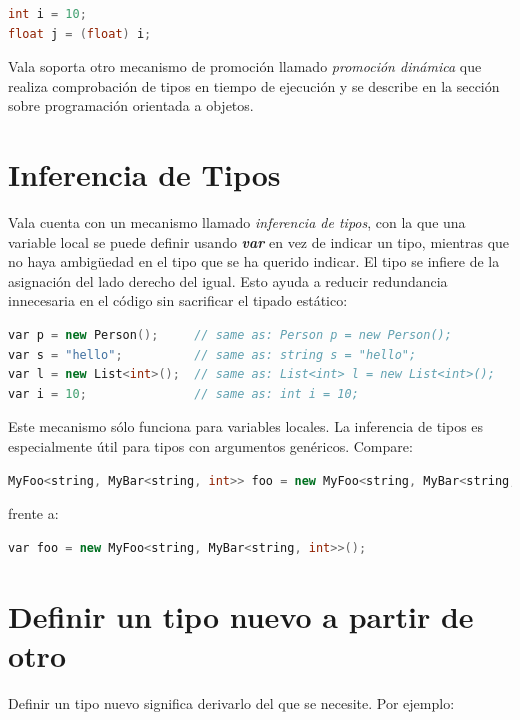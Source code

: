 \documentclass[12pt,twoside]{book}
\begin{document}
\begin{lstlisting}[language=C++]
int i = 10;
float j = (float) i;
\end{lstlisting}

Vala soporta otro mecanismo de promoción llamado \textit{promoción dinámica} que realiza comprobación de tipos en tiempo de ejecución y se describe en la sección sobre programación orientada a objetos.

\section{Inferencia de Tipos}

Vala cuenta con un mecanismo llamado \textit{inferencia de tipos}, con la que una variable local se puede definir usando \textbf{\textit{var}} en vez de indicar un tipo, mientras que no haya ambigüedad en el tipo que se ha querido indicar. El tipo se infiere de la asignación del lado derecho del igual. Esto ayuda a reducir redundancia innecesaria en el código sin sacrificar el tipado estático:

\begin{lstlisting}[language=C++]
var p = new Person();     // same as: Person p = new Person();
var s = "hello";          // same as: string s = "hello";
var l = new List<int>();  // same as: List<int> l = new List<int>();
var i = 10;               // same as: int i = 10;
\end{lstlisting}

Este mecanismo sólo funciona para variables locales. La inferencia de tipos es especialmente útil para tipos con argumentos genéricos. Compare:

\begin{lstlisting}[language=C++]
MyFoo<string, MyBar<string, int>> foo = new MyFoo<string, MyBar<string, int>>();
\end{lstlisting}

frente a:
 
\begin{lstlisting}[language=C++] 
var foo = new MyFoo<string, MyBar<string, int>>();
\end{lstlisting} 
 

\section{Definir un tipo nuevo a partir de otro}

Definir un tipo nuevo significa derivarlo del que se necesite. Por ejemplo:
\end{document}
